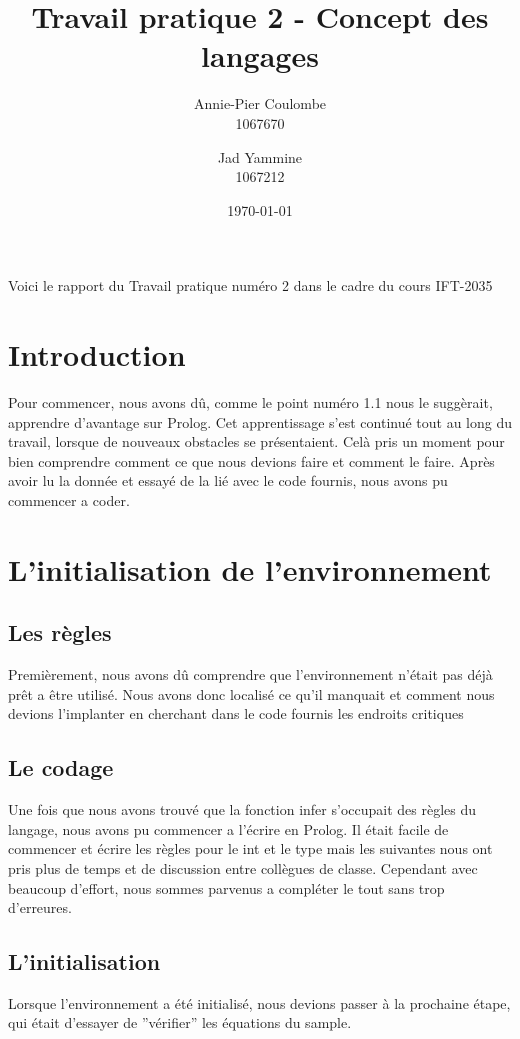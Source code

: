 \documentclass[a4paper]{article}
\title{Travail pratique 2 - Concept des langages}
\author{Annie-Pier Coulombe \\1067670 \and Jad Yammine \\1067212}
\date{\today}
\begin{document}
\maketitle

\begin{center}
Voici le rapport du Travail pratique numéro 2 dans le cadre du cours IFT-2035
\end{center}

\section{Introduction}
\label{sec:introduction}

Pour commencer, nous avons dû, comme le point numéro 1.1 nous le suggèrait, apprendre d'avantage sur Prolog. Cet apprentissage s'est continué tout au long du travail, lorsque de nouveaux obstacles se présentaient. Celà pris un moment pour bien comprendre comment ce que nous devions faire et comment le faire. Après avoir lu la donnée et essayé de la lié avec le code fournis, nous avons pu commencer a coder.

\section{L'initialisation de l'environnement}
\label{sec:theory}

\subsection{Les règles}
Premièrement, nous avons dû comprendre que l'environnement n'était pas déjà prêt a être utilisé. Nous avons donc localisé ce qu'il manquait et comment nous devions l'implanter en cherchant dans le code fournis les endroits critiques

\subsection{Le codage}
Une fois que nous avons trouvé que la fonction infer s'occupait des règles du langage, nous avons pu commencer a l'écrire en Prolog. Il était facile de commencer et écrire les règles pour le int et le type mais les suivantes nous ont pris plus de temps et de discussion entre collègues de classe. Cependant avec beaucoup d'effort, nous sommes parvenus a compléter le tout sans trop d'erreures.

\subsection{L'initialisation}
Lorsque l'environnement a été initialisé, nous devions passer à la prochaine étape, qui était d'essayer de ''vérifier'' les équations du sample.
\end{document}
